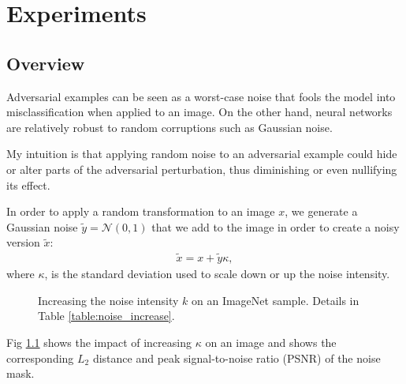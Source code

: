 \chapter{Experiments}
\label{Experiments}
\overridetextsize

\section{Overview}
\label{sec:experiments_overview}


Adversarial examples can be seen as a worst-case noise that fools the model into
misclassification when applied to an image. On the other hand, neural networks
are relatively robust to random corruptions such as Gaussian noise.

My intuition is that applying random noise to an adversarial example could hide
or alter parts of the adversarial perturbation, thus diminishing or even
nullifying its effect.

In order to apply a random transformation to an image $x$, we generate a
Gaussian noise $\tilde{y}=\mathcal{N}(0,1)$ that we add to the image in order to
create a noisy version $\tilde{x}$:
\begin{align} \label{eq:noisy_version}
    \tilde{x}=x+\tilde{y}\kappa,
\end{align}
where $\kappa$, is the standard deviation used to scale down or up the noise
intensity.

\begin{figure}
      

      

    \caption{ Increasing the noise intensity $k$ on an ImageNet sample. Details
        in Table \ref{table:noise_increase}.}
    \label{fig:noise_increase}
\end{figure}

Fig \ref{fig:noise_increase} shows the impact of increasing $\kappa$ on an image
and shows the corresponding $L_2$ distance and peak signal-to-noise ratio (PSNR)
of the noise mask.

